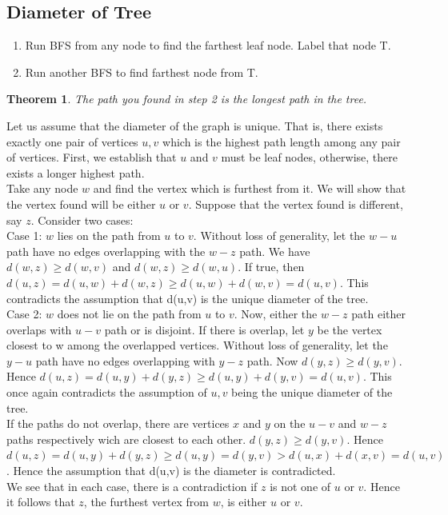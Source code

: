 \documentclass[]{book}
\makeatletter
\newtheorem{theorem}{Theorem}[chapter]
\renewenvironment{proof}[1][\proofname] {\par\pushQED{\qed}\normalfont\topsep6\p@\@plus6\p@\relax\trivlist\item[\hskip\labelsep\bfseries#1\@addpunct{.}]\ignorespaces}{\popQED\endtrivlist\@endpefalse}
\makeatother
\begin{document}
  \subsection{Diameter of Tree}
  \begin{enumerate}
    \item Run BFS from any node to find the farthest leaf node. Label that node T.
    \item Run another BFS to find farthest node from T.
  \end{enumerate}
  \begin{theorem}
    The path you found in step 2 is the longest path in the tree.
  \end{theorem}
  \begin{proof}
    Let us assume that the diameter of the graph is unique. That is, there exists exactly
    one pair of vertices ${u,v}$ which is the highest path length among any pair of vertices.
    First, we establish that $u$ and $v$ must be leaf nodes, otherwise, there exists a
    longer highest path.\\
    \indent{}Take any node $w$ and find the vertex which is furthest from it. We will show that the vertex
    found will be either $u$ or $v$. Suppose that the vertex found is different, say $z$.
    Consider two cases:\\
    \indent{}Case 1: $w$ lies on the path from $u$ to $v$.
    Without loss of generality, let the $w-u$ path have no edges overlapping with the $w-z$ path.
    We have $d(w,z) \geq d(w,v)$ and $d(w,z) \geq d(w,u)$. If true, then $d(u,z) = d(u,w) + d(w,z)
    \geq d(u,w) + d(w,v) = d(u,v)$. This contradicts the assumption that d(u,v) is the unique diameter of the
    tree.\\
    \indent{}Case 2: $w$ does not lie on the path from $u$ to $v$. Now, either the $w-z$ path
    either overlaps with $u-v$ path or is disjoint. If there is overlap, let $y$ be the vertex
    closest to w among the overlapped vertices. Without loss of generality, let the $y-u$ path
    have no edges overlapping with $y-z$ path. Now $d(y,z) \geq d(y,v).$ Hence $d(u,z) = d(u,y) + d(y,z)
    \geq d(u,y) + d(y,v) = d(u,v)$. This once again contradicts the assumption of ${u,v}$ being the
    unique diameter of the tree.\\
    \indent{}If the paths do not overlap, there are vertices $x$ and $y$ on the $u-v$ and $w-z$ paths
    respectively wich are closest to each other. $d(y,z) \geq d(y,v)$. Hence $d(u,z) = d(u,y) + d(y,z)
    \geq d(u,y) = d(y,v) > d(u,x) + d(x,v) = d(u,v)$. Hence the assumption that d(u,v) is the diameter
    is contradicted.\\
    \indent{}We see that in each case, there is a contradiction if $z$ is not one of $u$ or $v$. Hence it follows
    that $z$, the furthest vertex from $w$, is either $u$ or $v$.
  \end{proof}
\end{document}

